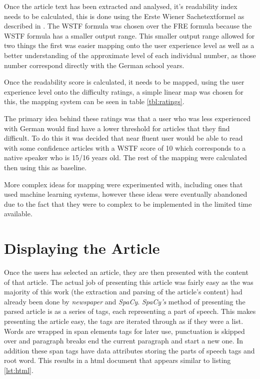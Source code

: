 Once the article text has been extracted and analysed, it's readability index needs to be calculated, this is done using the Erste Wiener Sachetextformel as described in \textcite{bamberger1984}. The WSTF formula was chosen over the FRE formula because the WSTF formula has a smaller output range. This smaller output range allowed for two things the first was easier mapping onto the user experience level as well as a better understanding of the approximate level of each individual number, as those number correspond directly with the German school years. 

Once the readability score is calculated, it needs to be mapped, using the user experience level onto the difficulty ratings, a simple linear map was chosen for this, the mapping system can be seen in table \ref{tbl:ratings}.



The primary idea behind these ratings was that a user who was less experienced with German would find have a lower threshold for articles that they find difficult. To do this it was decided that near fluent user would be able to read with some confidence articles with a WSTF score of 10 which corresponds to a native speaker who is 15/16 years old. The rest of the mapping were calculated then using this as baseline. 

More complex ideas for mapping were experimented with, including ones that used machine learning systems, however these ideas were eventually abandoned due to the fact that they were to complex to be implemented in the limited time available. 

\section{Displaying the Article}

Once the users has selected an article, they are then presented with the content of that article. The actual job of presenting this article was fairly easy as the was majority of this work (the extraction and parsing of the article's content) had already been done by \textit{newspaper} and \textit{SpaCy}.  \textit{SpaCy's} method of presenting the parsed article is as a series of tags, each representing a part of speech. This makes presenting the article easy, the tags are iterated through as if they were a list. Words are wrapped in span elements tags for later use, punctuation is skipped over and paragraph breaks end the current paragraph and start a new one. In addition these span tags have data attributes storing the parts of speech tags and root word. This results in a html document that appears similar to listing \ref{lst:html}.

